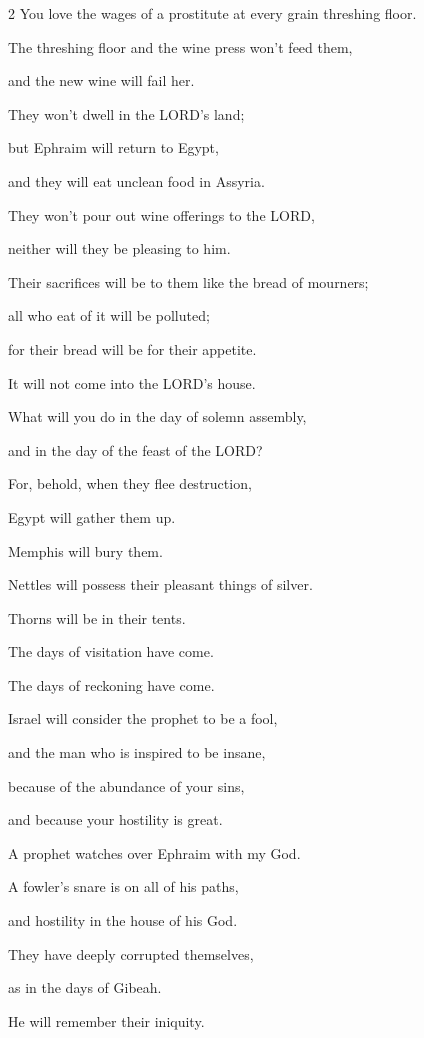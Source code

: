 \begin{multicols}{2}
You love the wages of a prostitute at every grain threshing floor.

\myverse{}The threshing floor and the wine press won’t feed them,

and the new wine will fail her.

\myverse{}They won’t dwell in the LORD’s land;

but Ephraim will return to Egypt,

and they will eat unclean food in Assyria.

\myverse{}They won’t pour out wine offerings to the LORD,

neither will they be pleasing to him.

Their sacrifices will be to them like the bread of mourners;

all who eat of it will be polluted;

for their bread will be for their appetite.

It will not come into the LORD’s house.

\myverse{}What will you do in the day of solemn assembly,

and in the day of the feast of the LORD?

\myverse{}For, behold, when they flee destruction,

Egypt will gather them up.

Memphis will bury them.

Nettles will possess their pleasant things of silver.

Thorns will be in their tents.

\myverse{}The days of visitation have come.

The days of reckoning have come.

Israel will consider the prophet to be a fool,

and the man who is inspired to be insane,

because of the abundance of your sins,

and because your hostility is great.

\myverse{}A prophet watches over Ephraim with my God.

A fowler’s snare is on all of his paths,

and hostility in the house of his God.

\myverse{}They have deeply corrupted themselves,

as in the days of Gibeah.

He will remember their iniquity.


\end{multicols}
